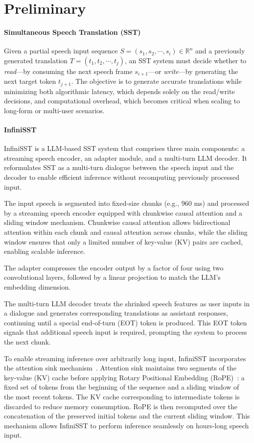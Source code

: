 \section{Preliminary}

\paragraph{Simultaneous Speech Translation (SST)} 
Given a partial speech input sequence \( S = (s_1, s_2, \cdots, s_i) \in \mathbb{R}^n \) and a previously generated translation \( T = (t_1, t_2, \cdots, t_j) \), an SST system must decide whether to \emph{read}—by consuming the next speech frame \( s_{i+1} \)—or \emph{write}—by generating the next target token \( t_{j+1} \). The objective is to generate accurate translations while minimizing both algorithmic latency, which depends solely on the read/write decisions, and computational overhead, which becomes critical when scaling to long-form or multi-user scenarios.

\paragraph{InfiniSST}
InfiniSST is a LLM-based SST system that comprises three main components: a streaming speech encoder, an adapter module, and a multi-turn LLM decoder. It reformulates SST as a multi-turn dialogue between the speech input and the decoder to enable efficient inference without recomputing previously processed input.

The input speech is segmented into fixed-size chunks (e.g., 960 ms) and processed by a streaming speech encoder equipped with chunkwise causal attention and a sliding window mechanism. Chunkwise causal attention allows bidirectional attention within each chunk and causal attention across chunks, while the sliding window ensures that only a limited number of key-value (KV) pairs are cached, enabling scalable inference.

The adapter compresses the encoder output by a factor of four using two convolutional layers, followed by a linear projection to match the LLM’s embedding dimension.

The multi-turn LLM decoder treats the shrinked speech features as user inputs in a dialogue and generates corresponding translations as assistant responses, continuing until a special end-of-turn (EOT) token is produced. This EOT token signals that additional speech input is required, prompting the system to process the next chunk.

To enable streaming inference over arbitrarily long input, InfiniSST incorporates the attention sink mechanism~\cite{}. Attention sink maintains two segments of the key-value (KV) cache before applying Rotary Positional Embedding (RoPE)~\cite{}: a fixed set of tokens from the beginning of the sequence and a sliding window of the most recent tokens. The KV cache corresponding to intermediate tokens is discarded to reduce memory consumption. RoPE is then recomputed over the concatenation of the preserved initial tokens and the current sliding window. This mechanism allows InfiniSST to perform inference seamlessly on hours-long speech input.